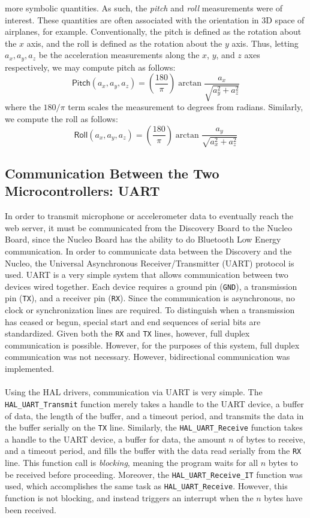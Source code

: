 more symbolic quantities. As such, the \textit{pitch} and \textit{roll} measurements were of
interest. These quantities are often associated with the orientation in 3D space of airplanes, for
example. Conventionally, the pitch is defined as the rotation about the $x$ axis, and the roll is
defined as the rotation about the $y$ axis. Thus, letting $a_x, a_y, a_z$ be the acceleration
measurements along the $x$, $y$, and $z$ axes respectively, we may compute pitch as follows:
\begin{equation}
	\mathsf{Pitch}(a_x,a_y,a_z) = \left(\frac{180}{\pi}\right)\arctan\frac{a_x}{\sqrt{a_y^2+a_z^2}}
\end{equation}
where the $180/\pi$ term scales the measurement to degrees from radians. Similarly, we compute the
roll as follows:
\begin{equation}
	\mathsf{Roll}(a_x,a_y,a_z) = \left(\frac{180}{\pi}\right)\arctan\frac{a_y}{\sqrt{a_x^2+a_z^2}}
\end{equation}
\subsection{Communication Between the Two Microcontrollers: UART}
In order to transmit microphone or accelerometer data to eventually reach the web server, it must be
communicated from the Discovery Board to the Nucleo Board, since the Nucleo Board has the ability to
do Bluetooth Low Energy communication. In order to communicate data between the Discovery and the
Nucleo, the Universal Asynchronous Receiver/Transmitter (UART) protocol is used. UART is a very
simple system that allows communication between two devices wired together. Each device requires a
ground pin (\texttt{GND}), a transmission pin (\texttt{TX}), and a receiver pin (\texttt{RX}). Since
the communication is asynchronous, no clock or synchronization lines are required. To distinguish
when a transmission has ceased or begun, special start and end sequences of serial bits are
standardized. Given both the \texttt{RX} and \texttt{TX} lines, however, full duplex communication
is possible. However, for the purposes of this system, full duplex communication was not necessary.
However, bidirectional communication was implemented.\\\\
Using the HAL drivers, communication via UART is very simple. The \texttt{HAL\_UART\_Transmit}
function merely takes a handle to the UART device, a buffer of data, the length of the buffer, and a
timeout period, and transmits the data in the buffer serially on the \texttt{TX} line. Similarly, the
\texttt{HAL\_UART\_Receive} function takes a handle to the UART device, a buffer for data, the
amount $n$ of bytes to receive, and a
timeout period, and fills the buffer with the data read serially from the \texttt{RX} line. This
function call is \textit{blocking}, meaning the program waits for all $n$ bytes to be received before
proceeding. Moreover, the \texttt{HAL\_UART\_Receive\_IT} function was used, which accomplishes the
same task as \texttt{HAL\_UART\_Receive}. However, this function is not blocking, and instead
triggers an interrupt when the $n$ bytes have been received.
